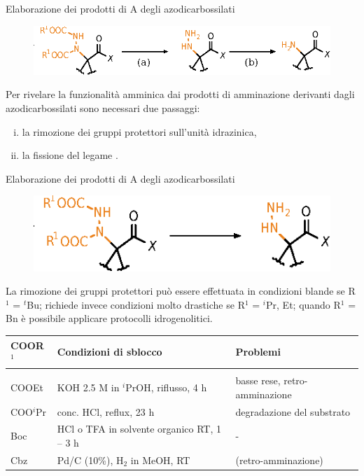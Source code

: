 \documentclass[10pt]{beamer}
\begin{document}
\begin{frame}[fragile]{Elaborazione dei prodotti di {\textalpha}A degli azodicarbossilati}
\begin{figure}[H]  	
	\centering
	\includegraphics[scale=0.7]{P_genericelaboration.eps}
\end{figure}  
Per rivelare la funzionalità amminica dai prodotti di amminazione derivanti dagli azodicarbossilati sono necessari due passaggi:
\begin{enumerate}[(i)]
	\item la rimozione dei gruppi protettori sull'unità idrazinica,
	\item la fissione del legame .
\end{enumerate}
\end{frame}

\begin{frame}[fragile]{Elaborazione dei prodotti di {\textalpha}A degli azodicarbossilati}
\begin{figure}[H]  	
	\centering
	\includegraphics[scale=0.7]{P_elaboration1.eps}
\end{figure}  
	La rimozione dei gruppi protettori può essere effettuata in \alert{condizioni blande se R$^1$ = $^t$Bu}; richiede invece condizioni molto drastiche se R$^1$ = $^i$Pr, Et; quando R$^1$ = Bn è possibile applicare protocolli idrogenolitici.
	\begin{table}[H]
		\begin{tabular}{K{1cm} K{4cm} K{4cm}}
			COOR$^1$ & Condizioni di sblocco & Problemi\\ 
			\hline \\
			COOEt & KOH 2.5 M in $^i$PrOH, riflusso, 4 h  & basse rese, retro-amminazione\\	
			COO$^i$Pr & conc. HCl, reflux, 23 h & degradazione del substrato\\		
			\alert{Boc} & \alert{HCl o TFA in solvente organico RT, 1 -- 3 h} & -\\	
			Cbz & Pd/C (10\%), H$_2$ in MeOH, RT & (retro-amminazione)\\
			\hline
		\end{tabular}
	\end{table}

\end{frame}
\end{document}
